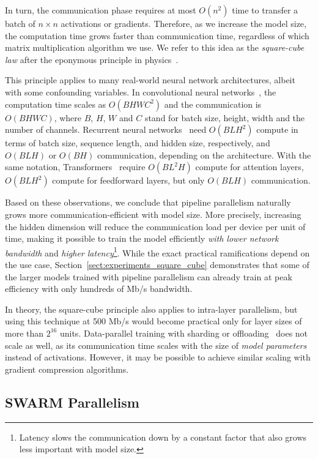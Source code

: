 In turn, the communication phase requires at most $O(n^2)$ time to transfer a batch of $n{\times}n$ activations or gradients. Therefore, as we increase the model size, the computation time grows faster than communication time, regardless of which matrix multiplication algorithm we use. We refer to this idea as the \textit{square-cube law} after the eponymous principle in physics~\citep{square_cube,mechanics}.

This principle applies to many real-world neural network architectures, albeit with some confounding variables. In convolutional neural networks~\cite{conv_first}, the computation time scales as $O(B H W C^2)$ and the communication is $O(B H W C)$, where $B$, $H$, $W$ and $C$ stand for batch size, height, width and the number of channels. Recurrent neural networks~\citep{backprop_rnn,lstm} need $O(B L H^2)$ compute in terms of batch size, sequence length, and hidden size, respectively, and $O(B L H)$ or $O(B H)$ communication, depending on the architecture. With the same notation, Transformers~\citep{transformer} require $O(B L^2 H)$ compute for attention layers, $O(B L H^2)$ compute for feedforward layers, but only $O(B L H)$ communication.%


Based on these observations, we conclude that pipeline parallelism naturally grows more communication-efficient with model size. More precisely, increasing the hidden dimension will reduce the communication load per device per unit of time, making it possible to train the model efficiently \textit{with lower network bandwidth} and \textit{higher latency}\footnote{Latency slows the communication down by a constant factor that also grows less important with model size.}. While the exact practical ramifications depend on the use case, Section~\ref{sect:experiments_square_cube} demonstrates that some of the larger models trained with pipeline parallelism can already train at peak efficiency with only hundreds of Mb/s bandwidth.


In theory, the square-cube principle also applies to intra-layer parallelism, but using this technique at 500 Mb/s would become practical only for layer sizes of more than $2^{16}$ units. Data-parallel training with sharding or offloading~\citep{zerooffload} does not scale as well, as its communication time scales with the size of \textit{model parameters} instead of activations. However, it may be possible to achieve similar scaling with gradient compression algorithms.


\subsection{SWARM Parallelism}\label{sect:method_swarm}

